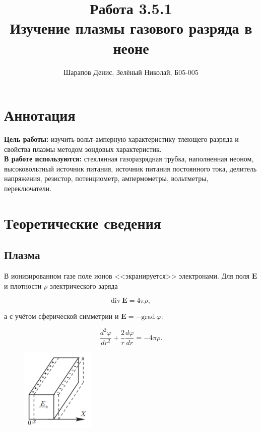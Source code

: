 \documentclass[a4paper]{article}
\title{Работа 3.5.1 \\ Изучение плазмы газового разряда в неоне}
\author{Шарапов Денис, Зелёный Николай, Б05-005}
\date{}
\theoremstyle{definition}
\theoremstyle{remark}
\begin{document}
    \maketitle
    \tableofcontents
    \newpage
    
\section{Аннотация}

 \textbf{Цель работы:} изучить вольт-амперную характеристику тлеющего разряда и свойства плазмы методом зондовых характеристик.\\
 
 \noindent \textbf{В работе используются:} стеклянная газоразрядная трубка, наполненная неоном, высоковольтный источник питания, источник питания постоянного тока, делитель напряжения, резистор, потенциометр, ампермометры, вольтметры, переключатели.
 
 \section{Теоретические сведения}
 
 \subsection{Плазма}

В ионизированном газе поле ионов <<экранируется>> электронами. Для поля $\mathbf{E}$ и плотности $\rho$ электрического заряда

$$\text{div}~\mathbf{E} = 4 \pi \rho, $$

а с учётом сферической симметрии и $\mathbf{E} = -\text{grad}~\varphi$:

\begin{equation}
    \dfrac{d^2 \varphi}{dr^2}+\dfrac{2}{r}\dfrac{d\varphi}{dr}=-4\pi \rho.
\end{equation}

\begin{figure}
    \centering
    \includegraphics[width = 100pt]{image/first.png}
\end{figure} 
\end{document}

